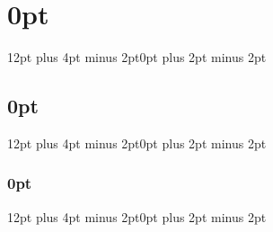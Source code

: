 \usepackage[raggedright]{titlesec}%
\titlespacing\section{0pt}{12pt plus 4pt minus 2pt}{0pt plus 2pt minus 2pt}
\titlespacing\subsection{0pt}{12pt plus 4pt minus 2pt}{0pt plus 2pt minus 2pt}
\titlespacing\subsubsection{0pt}{12pt plus 4pt minus 2pt}{0pt plus 2pt minus 2pt}
\setlength{\parindent}{15pt}
  
\renewcommand{\topfraction}{0.85}
\renewcommand{\bottomfraction}{0.6}
\renewcommand{\floatpagefraction}{0.8}
\setcounter{topnumber}{2}
